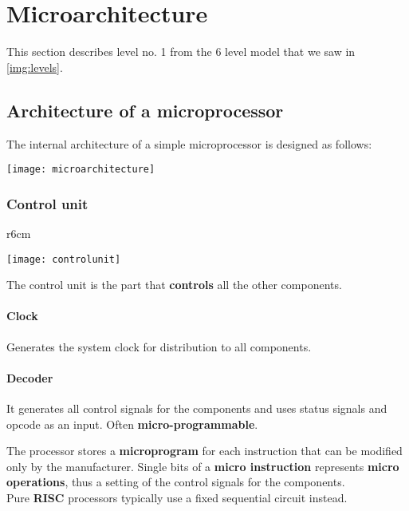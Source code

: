 \newpage
\section{Microarchitecture}
This section describes level no. 1 from the 6 level model that we saw in \ref{img:levels}.
\subsection{Architecture of a microprocessor}
The internal architecture of a simple microprocessor is designed as follows:
\begin{center}
	\texttt{[image: microarchitecture]}
\end{center}

\subsubsection{Control unit}

\begin{wrapfigure}[4]{r}{6cm}
	\vspace{-1.1cm}
	\begin{center}
		\texttt{[image: controlunit]}
	\end{center}
\end{wrapfigure}

The control unit is the part that \textbf{controls} all the other components.
\paragraph{Clock} Generates the system clock for distribution to all components.

\paragraph{Decoder} 
It generates all control signals for the components and uses status signals and opcode as an input. Often \textbf{micro-programmable}.

\begin{definition}
	The processor stores a \textbf{microprogram} for each instruction that can be modified only by the manufacturer. Single bits of a \textbf{micro instruction} represents \textbf{micro operations}, thus a setting of the control signals for the components.\\
	Pure \textbf{RISC} processors typically use a fixed sequential circuit instead.
\end{definition}

